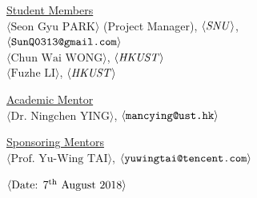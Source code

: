\begin{center}
\vspace{0.35in}
\underline {Student Members}\\
\vspace{5pt}
$\langle \text{Seon Gyu PARK}\rangle$ (Project Manager), $\langle \text{\emph{SNU}}\rangle$,\\ 
\vspace{3pt}
$\langle \text{\texttt{SunQ0313@gmail.com}} \rangle$\\
\vspace{5pt}
$\langle \text{Chun Wai WONG}\rangle$, $\langle \text{\emph{HKUST}} \rangle$ \\
\vspace{3pt}
$\langle \text{Fuzhe LI}\rangle$, $\langle \text{\emph{HKUST}} \rangle$ \\
\vspace{3pt}


\vspace \shiftdownb
\underline {Academic Mentor} \\
\vspace{5pt}
$\langle \text{Dr. Ningchen YING}\rangle$, $\langle \text{\texttt{mancying@ust.hk}} \rangle$

\vspace \shiftdownb
\underline {Sponsoring Mentors}\\
\vspace{5pt}
$\langle \text{Prof. Yu-Wing TAI}\rangle$, $\langle \text{\texttt{yuwingtai@tencent.com}} \rangle$\\
\vspace{3pt}


\vspace{5pt}
\vspace{3pt}

\vspace \shiftdowna
$\langle \text{Date: $7^{\textnormal{th}}$ August 2018}\rangle$ 

\end{center}

 
